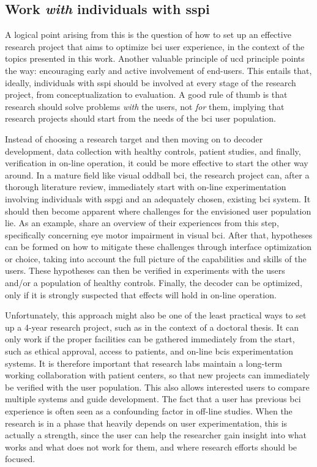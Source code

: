 \subsection{Work \emph{with} individuals with \acs{sspi}}

A logical point arising from this is the question of how to set up an
effective research project that aims to optimize \ac{bci} user experience, in
the context of the topics presented in this work.
Another valuable principle of \ac{ucd} principle points the way: encouraging early and active
involvement of end-users.
This entails that, ideally, individuals with \ac{sspi} should be involved at
every stage of the research project, from conceptualization
to evaluation.
A good rule of thumb is that research should solve problems \emph{with} the
users, not \emph{for} them, implying that research projects should start from
the needs of the \ac{bci} user population.

Instead of choosing a research target and then moving on to decoder
development, data collection with healthy controls, patient studies, and
finally, verification in on-line operation, it could be more effective to start
the other way around.
In a mature field like visual oddball \ac{bci}, the research project can, after
a thorough literature review, immediately start with on-line experimentation
involving individuals with \ac{sspgi} and an adequately chosen, existing \ac{bci} system.
It should then become apparent where challenges for the envisioned user
population lie.
As an example, \textcite{FriedOken2020} share an overview of their experiences from this step,
specifically concerning eye motor impairment in visual \ac{bci}.
After that, hypotheses can be formed on how to mitigate these challenges
through interface optimization or choice, taking into account the full picture
of the capabilities and skills of the users.
These hypotheses can then be verified in experiments
with the users and/or a population of healthy controls.
Finally, the decoder can be optimized, only if it is strongly suspected that
effects will hold in on-line operation.

Unfortunately, this approach might also be one of the least practical ways to set up
a 4-year research project, such as in the context of a doctoral thesis.
It can only work if the proper facilities can be gathered immediately
from the start, such as ethical approval, access to patients, and on-line \acp{bci}
experimentation systems.
It is therefore important that research labs maintain a long-term working
collaboration with patient centers, so that new projects can immediately be
verified with the user population. This also allows interested users to compare
multiple systems and guide development.
The fact that a user has previous \ac{bci} experience is often seen as a confounding
factor in off-line studies.
When the research is in a phase that heavily depends on user
experimentation, this is actually a strength, since the user can help the researcher gain
insight into what works and what does not work for them, and where research efforts
should be focused.

